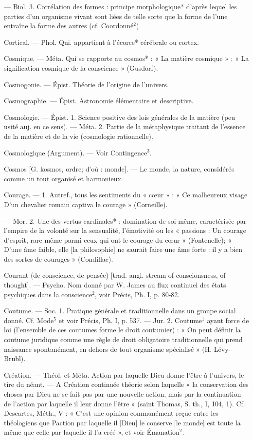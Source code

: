 — Biol. 3. Corrélation des formes :
principe morphologique* d’après lequel les parties d’un organisme
vivant sont liées de telle sorte que
la forme de l'une entraîne la forme
des autres (cf. Coordonné$^2$).

Cortical. — Phol. Qui. appartient à
l’écorce* cérébrale ou cortex.

Cosmique. — Méta. Qui se rapporte au
cosmos* : « La matière cosmique » ;
« La signification cosmique de la
conscience » (Gusdorf).

Cosmogonie. — Épist. Théorie de
l’origine de l'univers.

Cosmographie. — Épist. Astronomie
élémentaire et descriptive.

Cosmologie. — Épist. 1. Science positive des lois générales de la matière
(peu usité auj. en ce sens). — Méta.
2. Partie de la métaphysique traitant de l’essence de la matière et de
la vie (cosmologie rationnelle).

Cosmologique (Argument). — Voir
Contingence$^3$.

Cosmos [G. kosmos, ordre; d'où :
monde]. — Le monde, la nature,
considérés comme un tout organisé
et harmonieux.

Courage. — 1. Autref., tous les sentiments du « cœur » : « Ce malheureux
visage D'un chevalier romain captiva
le courage » (Corneille).

— Mor. 2. Une des vertus cardinales* : domination de soi-même,
caractérisée par l'empire de la volonté sur la sensualité, l'émotivité
ou les « passions : Un courage d’esprit, rare même parmi ceux qui ont
le courage du cœur » (Fontenelle);
« D'une âme faible, elle [la philosophie] ne saurait faire une âme
forte : il y a bien des sortes de courages » (Condillac).

Courant (de conscience, de pensée)
[trad. angl. stream of conscionsness,
of thought]. — Psycho. Nom donné
par W. James au flux continuel des
états psychiques dans la conscience$^2$,
voir Précis, Ph. I, p. 80-82.

Coutume. — Soc. 1. Pratique générale
et traditionnelle dans un groupe
social donné. Cf. Mode$^5$ et voir
Précis, Ph. I, p. 537. — Jur. 2. Coutume$^1$ ayant force de loi (l’ensemble
de ces coutumes forme le droit coutumier) : « On peut définir la coutume juridique comme une règle de
droit obligatoire traditionnelle qui
prend naissance spontanément, en
dehors de tout organisme spécialisé » (H. Lévy-Brubl).

Création. — Théol. et Méta. Action par
laquelle Dieu donne l'être à l’univers, le tire du néant. — A Création
continuée théorie selon laquelle
« la conservation des choses par
Dieu ne se fait pas par une nouvelle action, mais par la continuation de l’action par laquelle il leur
donne l’être » (saint Thomas, S. th.,
I, 104, 1). Cf. Descartes, Méth., V :
« C'est une opinion communément
reçue entre les théologiens que
Paction par laquelle il [Dieu] le
conserve [le monde] est toute la
même que celle par laquelle il l’a
créé », et voir Émanation$^2$.

